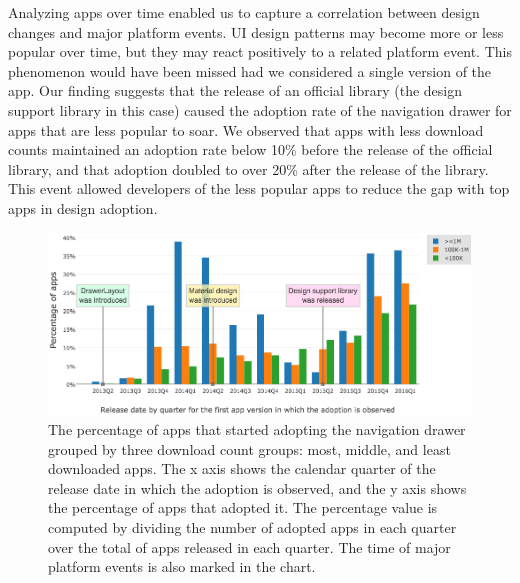 Analyzing apps over time enabled us to capture a correlation between design changes and major platform events.
UI design patterns may become more or less popular over time, but they may react positively to a related platform event.
This phenomenon would have been missed had we considered a single version of the app.
Our finding suggests that the release of an official library (the design support library in this case) caused the adoption rate of the navigation drawer for apps that are less popular to soar.
We observed that apps with less download counts maintained an adoption rate below 10\% before the release of the official library, and that adoption doubled to over 20\% after the release of the library.
This event allowed developers of the less popular apps to reduce the gap with top apps in design adoption.
\begin{figure}[H]
	\includegraphics[scale=0.5]{figures/findings/navdrawer_by_quarter_grouped_by_downloads.png}
	\caption{The percentage of apps that started adopting the navigation drawer grouped by three download count groups: most, middle, and least downloaded apps. The x axis shows the calendar quarter of the release date in which the adoption is observed, and the y axis shows the percentage of apps that adopted it. The percentage value is computed by dividing the number of adopted apps in each quarter over the total of apps released in each quarter. The time of major platform events is also marked in the chart.}
	\label{fig:navdrawer_quarter_download}
\end{figure}

